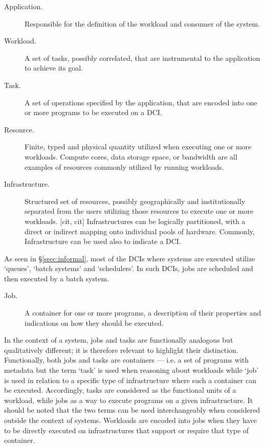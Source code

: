 \documentclass{sig-alternate}
\begin{document}
\begin{description}

\item[Application.] Responsible for the definition of the workload and consumer
of the \pilotjob system.

\item[Workload.] A set of tasks, possibly correlated, that are instrumental to
the application to achieve its goal.

\item[Task.] A set of operations specified by the application, that are encoded
into one or more programs to be executed on a DCI. 

\item[Resource.] Finite, typed and physical quantity utilized when
  executing one or more workloads. Compute cores, data storage space,
  or bandwidth are all examples of resources commonly utilized by
  running workloads.

\item[Infrastructure.] Structured set of resources, possibly
  geographically and institutionally separated from the users
  utilizing those resources to execute one or more workloads. [cit,
    cit] Infrastructures can be logically partitioned, with a direct
  or indirect mapping onto individual pools of hardware. Commonly,
  Infrastructure can be used also to indicate a DCI. 

\end{description}

As seen in \S\ref{ssec:informal}, most of the DCIs where \pilotjobs systems
are executed utilize `queues', `batch systems' and `schedulers'. In such DCIs,
jobs are scheduled and then executed by a batch system.

\begin{description}

\item[Job.] A container for one or more programs, a description of their
  properties and indications on how they should be executed.

\end{description}

In the context of a \pilotjob system, jobs and tasks are functionally analogous
but qualitatively different; it is therefore relevant to highlight their
distinction. Functionally, both jobs and tasks are containers --- i.e. a set of
programs with metadata but the term `task' is used when reasoning about
workloads while `job' is used in relation to a specific type of infrastructure
where such a container can be executed. Accordingly, tasks are considered as
the functional units of a workload, while jobs as a way to execute programs on
a given infrastructure. It should be noted that the two terms can be used
interchangeably when considered outside the context of \pilotjob systems.
Workloads are encoded into jobs when they have to be directly executed on
infrastructures that support or require that type of container.
\end{document}
